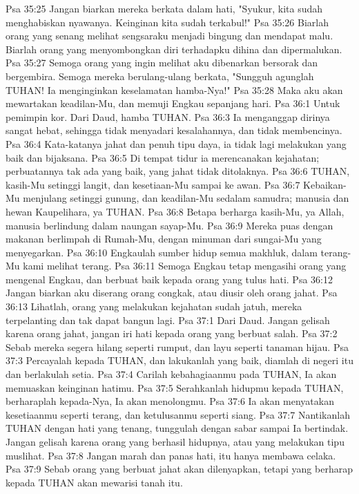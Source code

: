 Psa 35:25  Jangan biarkan mereka berkata dalam hati, "Syukur, kita sudah menghabiskan nyawanya. Keinginan kita sudah terkabul!"
Psa 35:26  Biarlah orang yang senang melihat sengsaraku menjadi bingung dan mendapat malu. Biarlah orang yang menyombongkan diri terhadapku dihina dan dipermalukan.
Psa 35:27  Semoga orang yang ingin melihat aku dibenarkan bersorak dan bergembira. Semoga mereka berulang-ulang berkata, "Sungguh agunglah TUHAN! Ia menginginkan keselamatan hamba-Nya!"
Psa 35:28  Maka aku akan mewartakan keadilan-Mu, dan memuji Engkau sepanjang hari.
Psa 36:1  Untuk pemimpin kor. Dari Daud, hamba TUHAN.
Psa 36:3  Ia menganggap dirinya sangat hebat, sehingga tidak menyadari kesalahannya, dan tidak membencinya.
Psa 36:4  Kata-katanya jahat dan penuh tipu daya, ia tidak lagi melakukan yang baik dan bijaksana.
Psa 36:5  Di tempat tidur ia merencanakan kejahatan; perbuatannya tak ada yang baik, yang jahat tidak ditolaknya.
Psa 36:6  TUHAN, kasih-Mu setinggi langit, dan kesetiaan-Mu sampai ke awan.
Psa 36:7  Kebaikan-Mu menjulang setinggi gunung, dan keadilan-Mu sedalam samudra; manusia dan hewan Kaupelihara, ya TUHAN.
Psa 36:8  Betapa berharga kasih-Mu, ya Allah, manusia berlindung dalam naungan sayap-Mu.
Psa 36:9  Mereka puas dengan makanan berlimpah di Rumah-Mu, dengan minuman dari sungai-Mu yang menyegarkan.
Psa 36:10  Engkaulah sumber hidup semua makhluk, dalam terang-Mu kami melihat terang.
Psa 36:11  Semoga Engkau tetap mengasihi orang yang mengenal Engkau, dan berbuat baik kepada orang yang tulus hati.
Psa 36:12  Jangan biarkan aku diserang orang congkak, atau diusir oleh orang jahat.
Psa 36:13  Lihatlah, orang yang melakukan kejahatan sudah jatuh, mereka terpelanting dan tak dapat bangun lagi.
Psa 37:1  Dari Daud. Jangan gelisah karena orang jahat, jangan iri hati kepada orang yang berbuat salah.
Psa 37:2  Sebab mereka segera hilang seperti rumput, dan layu seperti tanaman hijau.
Psa 37:3  Percayalah kepada TUHAN, dan lakukanlah yang baik, diamlah di negeri itu dan berlakulah setia.
Psa 37:4  Carilah kebahagiaanmu pada TUHAN, Ia akan memuaskan keinginan hatimu.
Psa 37:5  Serahkanlah hidupmu kepada TUHAN, berharaplah kepada-Nya, Ia akan menolongmu.
Psa 37:6  Ia akan menyatakan kesetiaanmu seperti terang, dan ketulusanmu seperti siang.
Psa 37:7  Nantikanlah TUHAN dengan hati yang tenang, tunggulah dengan sabar sampai Ia bertindak. Jangan gelisah karena orang yang berhasil hidupnya, atau yang melakukan tipu muslihat.
Psa 37:8  Jangan marah dan panas hati, itu hanya membawa celaka.
Psa 37:9  Sebab orang yang berbuat jahat akan dilenyapkan, tetapi yang berharap kepada TUHAN akan mewarisi tanah itu.

